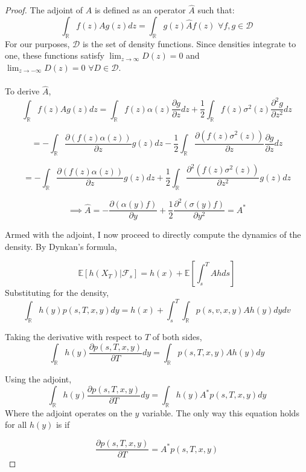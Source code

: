\documentclass{article}
\theoremstyle{definition}
\begin{document}
\begin{proof}
	The adjoint of \(A\) is defined as an operator \(\hat{A}\) such that:
	\[\int_\mathbb{R} f(z) A g(z) dz = \int_\mathbb{R} g(z) \hat{A} f(z)\,\,\forall f, g \in \mathcal{D}   \]
	For our purposes, \(\mathcal{D}\) is the set of density functions.  Since densities integrate to one, these functions satisfy \(\lim_{z \to \infty } D(z) =0 \) and \(\lim_{z \to -\infty} D(z)=0\,\,\forall D \in \mathcal{D}\).
	\\
	\\
	To derive \(\hat{A}\),  
	\[\int_\mathbb{R} f(z) A g(z) dz  = \int_\mathbb{R}  f(z)  \alpha(z) \frac{\partial g}{\partial z} dz+\frac{1}{2} \int_\mathbb{R} f(z)\sigma^2(z) \frac{\partial^2 g}{\partial z^2} dz \]
	
	\[= - \int_\mathbb{R}  \frac{\partial \left( f(z)  \alpha(z) \right)}{\partial z} g(z) dz -\frac{1}{2} \int_\mathbb{R} \frac{\partial \left(f(z)\sigma^2(z)\right) }{\partial z} \frac{\partial g}{\partial z} dz   \]
	
	\[ = - \int_\mathbb{R}  \frac{\partial \left( f(z)  \alpha(z) \right)}{\partial z} g(z) dz +\frac{1}{2} \int_\mathbb{R} \frac{\partial ^2 \left(f(z)\sigma^2(z) \right)}{\partial z^2} g(z) dz   \]
	
	
	\[ \implies \hat{A}= -\frac{\partial \left(\alpha(y) f\right)}{\partial y} + \frac{1}{2}\frac{\partial^2 \left(\sigma(y) f\right) } {\partial y^2} =A^* \]
	
	Armed with the adjoint, I now proceed to directly compute the dynamics of the density.  By Dynkan's formula,
	
	\[ \mathbb{E}[h(X_T)|\mathcal{F}_s]= h(x)+\mathbb{E}\left[\int_s^T A h ds \right]  \]
	Substituting for the density, 
	\[\int_\mathbb{R} h(y) p(s, T, x, y) dy = h(x)+ \int_s^T  \int_\mathbb{R}p(s, v, x, y) A h(y)   dy dv   \]
	
	Taking the derivative with respect to \(T\) of both sides,
	\[\int_\mathbb{R} h(y) \frac{\partial p(s, T, x, y)}{\partial T} dy = \int_\mathbb{R}  p(s, T, x, y) A h(y) dy   \]
	
	Using the adjoint,
	\[\int_\mathbb{R} h(y) \frac{\partial p(s, T, x, y)}{\partial T} dy= \int_\mathbb{R}  h(y) A^* p(s, T, x, y) dy  \]
	Where the adjoint operates on the \(y\) variable.  The only way this equation holds for all \(h(y)\) is if 
	
	\[\frac{\partial p(s, T, x, y)}{\partial T} = A^* p(s, T, x, y)  \]
	
	
\end{proof}
\end{document}
